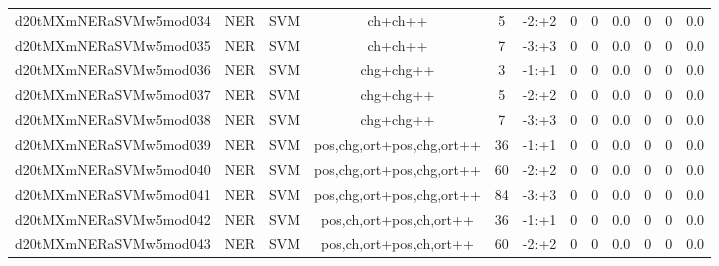 \documentclass[a4paper]{article}
\begin{document}
\begin{landscape}
\begin{center}
\begin{tabular}{ |c|c|c|c|c|c|c|c|c|c|c|c|}
 	

 
 	
 	\small{ d20tMXmNERaSVMw5mod034 } & \small{ NER} & \small{  SVM }  & ch+ch++  &  5 &  \small{  -2:+2 }  &  0 & 0 & 0.0  &  0 & 0 & 0.0 \\
 	

 
 	
 	\small{ d20tMXmNERaSVMw5mod035 } & \small{ NER} & \small{  SVM }  & ch+ch++  &  7 &  \small{  -3:+3 }  &  0 & 0 & 0.0  &  0 & 0 & 0.0 \\
 	

 
 	
 	\small{ d20tMXmNERaSVMw5mod036 } & \small{ NER} & \small{  SVM }  & chg+chg++  &  3 &  \small{  -1:+1 }  &  0 & 0 & 0.0  &  0 & 0 & 0.0 \\
 	

 
 	
 	\small{ d20tMXmNERaSVMw5mod037 } & \small{ NER} & \small{  SVM }  & chg+chg++  &  5 &  \small{  -2:+2 }  &  0 & 0 & 0.0  &  0 & 0 & 0.0 \\
 	

 
 	
 	\small{ d20tMXmNERaSVMw5mod038 } & \small{ NER} & \small{  SVM }  & chg+chg++  &  7 &  \small{  -3:+3 }  &  0 & 0 & 0.0  &  0 & 0 & 0.0 \\
 	

 
 	
 	\small{ d20tMXmNERaSVMw5mod039 } & \small{ NER} & \small{  SVM }  & pos,chg,ort+pos,chg,ort++  &  36 &  \small{  -1:+1 }  &  0 & 0 & 0.0  &  0 & 0 & 0.0 \\
 	

 
 	
 	\small{ d20tMXmNERaSVMw5mod040 } & \small{ NER} & \small{  SVM }  & pos,chg,ort+pos,chg,ort++  &  60 &  \small{  -2:+2 }  &  0 & 0 & 0.0  &  0 & 0 & 0.0 \\
 	

 
 	
 	\small{ d20tMXmNERaSVMw5mod041 } & \small{ NER} & \small{  SVM }  & pos,chg,ort+pos,chg,ort++  &  84 &  \small{  -3:+3 }  &  0 & 0 & 0.0  &  0 & 0 & 0.0 \\
 	

 
 	
 	\small{ d20tMXmNERaSVMw5mod042 } & \small{ NER} & \small{  SVM }  & pos,ch,ort+pos,ch,ort++  &  36 &  \small{  -1:+1 }  &  0 & 0 & 0.0  &  0 & 0 & 0.0 \\
 	

 
 	
 	\small{ d20tMXmNERaSVMw5mod043 } & \small{ NER} & \small{  SVM }  & pos,ch,ort+pos,ch,ort++  &  60 &  \small{  -2:+2 }  &  0 & 0 & 0.0  &  0 & 0 & 0.0 \\
 	


\end{tabular}
\end{center}
\end{landscape}
\end{document}
